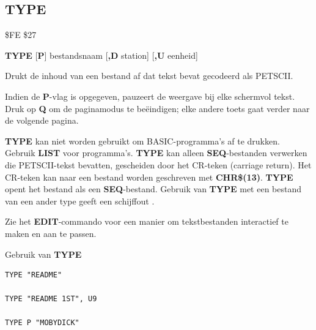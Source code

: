 \subsection{TYPE}
\begin{description}[leftmargin=2cm,style=nextline]
\item [Token:]    \$FE \$27

\item [Formaat:]   {\bf TYPE} [{\bf P}] bestandsnaam [{\bf,D} station] [{\bf,U} eenheid]

\item [Gebruik:]    Drukt de inhoud van een bestand af dat tekst bevat gecodeerd als PETSCII.

                  Indien de {\bf P}-vlag is opgegeven, pauzeert de weergave bij elke schermvol tekst. Druk op {\bf Q} om de paginamodus te beëindigen; elke andere toets gaat verder naar de volgende pagina.

                  \filenamedefinition

                  \drivedefinition

                  \unitdefinition

\item [Opmerkingen:]  {\bf TYPE} kan niet worden gebruikt om BASIC-programma's af te drukken. Gebruik {\bf LIST} voor programma's. {\bf TYPE} kan alleen {\bf SEQ}-bestanden verwerken die PETSCII-tekst bevatten, gescheiden door het CR-teken (carriage return). Het CR-teken kan naar een bestand worden geschreven met {\bf CHR\$(13)}. {\bf TYPE} opent het bestand als een {\bf SEQ}-bestand. Gebruik van {\bf TYPE} met een bestand van een ander type geeft een schijffout .

                  Zie het {\bf EDIT}-commando voor een manier om tekstbestanden interactief te maken en aan te passen.

\item [Voorbeelden:] Gebruik van {\bf TYPE}

\begin{tcolorbox}[colback=black,coltext=white]
\verbatimfont{\codefont}
\begin{verbatim}
TYPE "README"

TYPE "README 1ST", U9

TYPE P "MOBYDICK"
\end{verbatim}
\end{tcolorbox}
\end{description}

